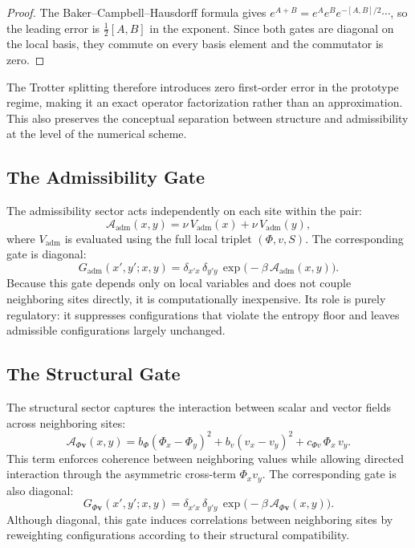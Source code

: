 \documentclass[11pt]{article}
\theoremstyle{definition}
\begin{document}
\begin{proof}
  The Baker--Campbell--Hausdorff formula gives $e^{A+B} = e^A e^B
  e^{-[A,B]/2}\cdots$, so the leading error is $\frac{1}{2}[A,B]$ in the
  exponent. Since both gates are diagonal on the local basis, they commute on
  every basis element and the commutator is zero.
\end{proof}

The Trotter splitting therefore introduces zero first-order error in the
prototype regime, making it an exact operator factorization rather than an
approximation. This also preserves the conceptual separation between structure
and admissibility at the level of the numerical scheme.

\subsection{The Admissibility Gate}

The admissibility sector acts independently on each site within the pair:
\[
  \mathcal{A}_{\mathrm{adm}}(x,y)
  = \nu\,V_{\mathrm{adm}}(x) + \nu\,V_{\mathrm{adm}}(y),
\]
where $V_{\mathrm{adm}}$ is evaluated using the full local triplet
$(\Phi,v,S)$. The corresponding gate is diagonal:
\[
  G_{\mathrm{adm}}(x',y';x,y)
  = \delta_{x'x}\,\delta_{y'y}\,
    \exp\!\bigl(-\beta\,\mathcal{A}_{\mathrm{adm}}(x,y)\bigr).
\]
Because this gate depends only on local variables and does not couple
neighboring sites directly, it is computationally inexpensive. Its role is
purely regulatory: it suppresses configurations that violate the entropy floor
and leaves admissible configurations largely unchanged.

\subsection{The Structural Gate}

The structural sector captures the interaction between scalar and vector fields
across neighboring sites:
\[
  \mathcal{A}_{\Phi\mathbf{v}}(x,y)
  = b_\Phi(\Phi_x - \Phi_y)^2
  + b_v(v_x - v_y)^2
  + c_{\Phi v}\,\Phi_x\,v_y.
\]
This term enforces coherence between neighboring values while allowing directed
interaction through the asymmetric cross-term $\Phi_x v_y$. The corresponding
gate is also diagonal:
\[
  G_{\Phi\mathbf{v}}(x',y';x,y)
  = \delta_{x'x}\,\delta_{y'y}\,
    \exp\!\bigl(-\beta\,\mathcal{A}_{\Phi\mathbf{v}}(x,y)\bigr).
\]
Although diagonal, this gate induces correlations between neighboring sites by
reweighting configurations according to their structural compatibility.
\end{document}
